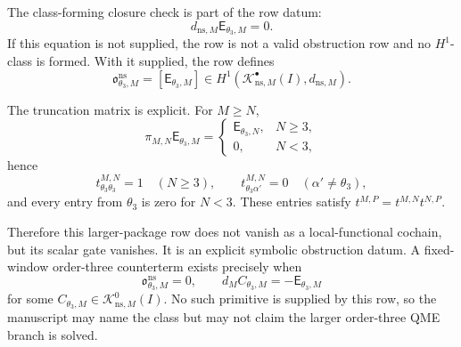 \begin{prop}
  The class-forming closure check is part of the row datum:
  \[
    d_{\mathrm{ns},M}\mathsf E_{\theta_3,M}=0.
  \]
  If this equation is not supplied, the row is not a valid obstruction row
  and no \(H^1\)-class is formed.  With it supplied, the row defines
  \[
    \mathfrak o^{\mathrm{ns}}_{\theta_3,M}
      =
    [\mathsf E_{\theta_3,M}]
      \in
    H^1\!\left(
      \mathcal K^\bullet_{\mathrm{ns},M}(I),d_{\mathrm{ns},M}
    \right).
  \]

  The truncation matrix is explicit.  For \(M\geq N\),
  \[
    \pi_{M,N}\mathsf E_{\theta_3,M}
      =
    \begin{cases}
      \mathsf E_{\theta_3,N}, & N\geq3,\\
      0, & N<3,
    \end{cases}
  \]
  hence
  \[
    t^{M,N}_{\theta_3\theta_3}=1\quad(N\geq3),\qquad
    t^{M,N}_{\theta_3\alpha'}=0\quad(\alpha'\neq\theta_3),
  \]
  and every entry from \(\theta_3\) is zero for \(N<3\).  These entries
  satisfy \(t^{M,P}=t^{M,N}t^{N,P}\).

  Therefore this larger-package row does not vanish as a local-functional
  cochain, but its scalar gate vanishes.  It is an explicit symbolic
  obstruction datum.  A fixed-window order-three counterterm exists
  precisely when
  \[
    \mathfrak o^{\mathrm{ns}}_{\theta_3,M}=0,
    \qquad
    d_M C_{\theta_3,M}=-\mathsf E_{\theta_3,M}
  \]
  for some \(C_{\theta_3,M}\in\mathcal K^0_{\mathrm{ns},M}(I)\).  No such
  primitive is supplied by this row, so the manuscript may name the class
  but may not claim the larger order-three QME branch is solved.
\end{prop}


